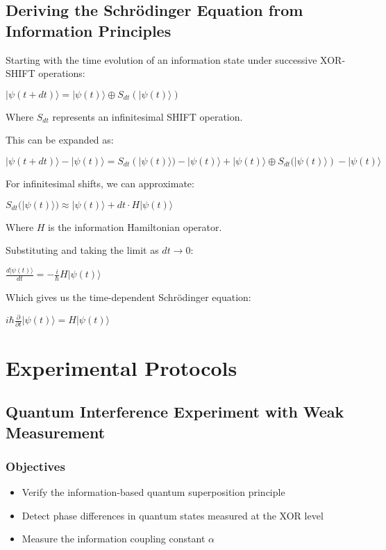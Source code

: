 \documentclass[12pt,letterpaper]{article}
\begin{document}
\subsection{Deriving the Schrödinger Equation from Information Principles}

Starting with the time evolution of an information state under successive XOR-SHIFT operations:

$|\psi(t+dt)\rangle = |\psi(t)\rangle \oplus S_{dt}(|\psi(t)\rangle)$

Where $S_{dt}$ represents an infinitesimal SHIFT operation. 

This can be expanded as:

$|\psi(t+dt)\rangle - |\psi(t)\rangle = S_{dt}(|\psi(t)\rangle) - |\psi(t)\rangle + |\psi(t)\rangle \oplus S_{dt}(|\psi(t)\rangle) - |\psi(t)\rangle$

For infinitesimal shifts, we can approximate:

$S_{dt}(|\psi(t)\rangle) \approx |\psi(t)\rangle + dt \cdot H|\psi(t)\rangle$

Where $H$ is the information Hamiltonian operator.

Substituting and taking the limit as $dt \to 0$:

$\frac{d|\psi(t)\rangle}{dt} = -\frac{i}{\hbar}H|\psi(t)\rangle$

Which gives us the time-dependent Schrödinger equation:

$i\hbar\frac{\partial}{\partial t}|\psi(t)\rangle = H|\psi(t)\rangle$

\newpage
\section{Experimental Protocols}

\subsection{Quantum Interference Experiment with Weak Measurement}

\subsubsection{Objectives}
\begin{itemize}
    \item Verify the information-based quantum superposition principle
    \item Detect phase differences in quantum states measured at the XOR level
    \item Measure the information coupling constant $\alpha$
\end{itemize}
\end{document}
